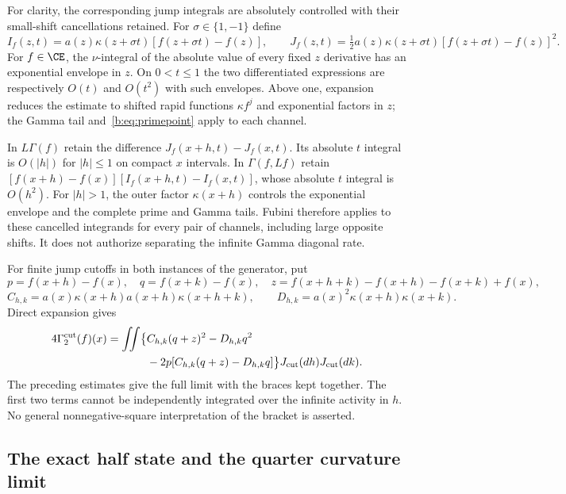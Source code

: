 \documentclass[11pt,a4paper]{article}
\numberwithin{equation}{section}
\theoremstyle{definition}\newtheorem{definition}[theorem]{Definition}
\theoremstyle{remark}\newtheorem{remark}[theorem]{Remark}
\begin{document}
For clarity, the corresponding jump integrals are absolutely controlled with their small-shift cancellations retained. For $\sigma\in\{1,-1\}$ define
\[
 I_f(z,t)=a(z)\kappa(z+\sigma t)[f(z+\sigma t)-f(z)],\qquad
 J_f(z,t)=\tfrac12a(z)\kappa(z+\sigma t)[f(z+\sigma t)-f(z)]^2.
\]
For $f\in\CE$, the $\nu$-integral of the absolute value of every fixed $z$ derivative has an exponential envelope in $z$. On $0<t\le1$ the two differentiated expressions are respectively $O(t)$ and $O(t^2)$ with such envelopes. Above one, expansion reduces the estimate to shifted rapid functions $\kappa f^j$ and exponential factors in $z$; the Gamma tail and~\eqref{b:eq:primepoint} apply to each channel.

In $L\Gamma(f)$ retain the difference $J_f(x+h,t)-J_f(x,t)$. Its absolute $t$ integral is $O(|h|)$ for $|h|\le1$ on compact $x$ intervals. In $\Gamma(f,Lf)$ retain
$[f(x+h)-f(x)][I_f(x+h,t)-I_f(x,t)]$, whose absolute $t$ integral is $O(h^2)$. For $|h|>1$, the outer factor $\kappa(x+h)$ controls the exponential envelope and the complete prime and Gamma tails. Fubini therefore applies to these cancelled integrands for every pair of channels, including large opposite shifts. It does not authorize separating the infinite Gamma diagonal rate.

For finite jump cutoffs in both instances of the generator, put
\[
 p=f(x+h)-f(x),\quad q=f(x+k)-f(x),\quad
 z=f(x+h+k)-f(x+h)-f(x+k)+f(x),
\]
\[
 C_{h,k}=a(x)\kappa(x+h)a(x+h)\kappa(x+h+k),\qquad
 D_{h,k}=a(x)^2\kappa(x+h)\kappa(x+k).
\]
Direct expansion gives
\begin{align}\label{b:eq:doublejump}
 4\Gamma_2^{\mathrm{cut}}(f)(x)
 =\iint\bigl\{&C_{h,k}(q+z)^2-D_{h,k}q^2\notag\\
 &-2p[C_{h,k}(q+z)-D_{h,k}q]\bigr\}
     J_{\mathrm{cut}}(dh)J_{\mathrm{cut}}(dk).
\end{align}
The preceding estimates give the full limit with the braces kept together. The first two terms cannot be independently integrated over the infinite activity in $h$. No general nonnegative-square interpretation of the bracket is asserted.

\subsection{The exact half state and the quarter curvature limit}\label{b:sec:curvature}
\end{document}
